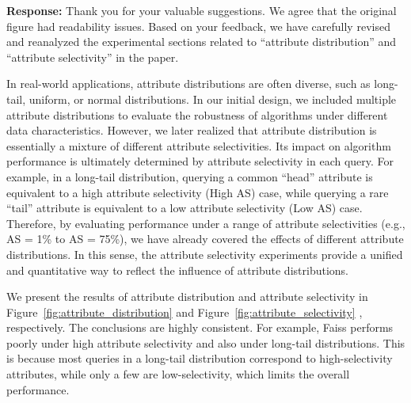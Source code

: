 \documentclass[sigconf, nonacm]{acmart}
\begin{document}
\noindent
%
%
\textbf{Response:} Thank you for your valuable suggestions. We agree that the original figure had readability issues. Based on your feedback, we have carefully revised and reanalyzed the experimental sections related to “attribute distribution” and “attribute selectivity” in the paper.

In real-world applications, attribute distributions are often diverse, such as long-tail, uniform, or normal distributions. In our initial design, we included multiple attribute distributions to evaluate the robustness of algorithms under different data characteristics. However, we later realized that attribute distribution is essentially a mixture of different attribute selectivities. Its impact on algorithm performance is ultimately determined by attribute selectivity in each query.
For example, in a long-tail distribution, querying a common “head” attribute is equivalent to a high attribute selectivity (High AS) case, while querying a rare “tail” attribute is equivalent to a low attribute selectivity (Low AS) case.
Therefore, by evaluating performance under a range of attribute selectivities (e.g., AS = 1\% to AS = 75\%), we have already covered the effects of different attribute distributions. In this sense, the attribute selectivity experiments provide a unified and quantitative way to reflect the influence of attribute distributions.

We present the results of attribute distribution and attribute selectivity in Figure~\ref{fig:attribute_distribution} and Figure~\ref{fig:attribute_selectivity} , respectively. The conclusions are highly consistent. For example, Faiss performs poorly under high attribute selectivity and also under long-tail distributions. This is because most queries in a long-tail distribution correspond to high-selectivity attributes, while only a few are low-selectivity, which limits the overall performance.
\end{document}
